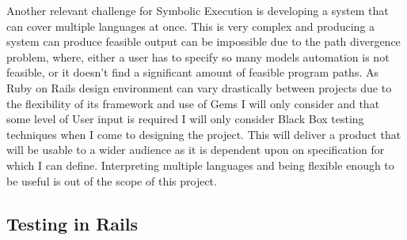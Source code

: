 \documentclass[a4paper,12pt]{article}
\begin{document}
\vspace{3mm}
\par Another relevant challenge for Symbolic Execution is developing a system that can cover multiple languages at once. This is very complex and producing a system can produce feasible output can be impossible due to the path divergence problem, where, either a user has to specify so many models automation is not feasible, or it doesn't find a significant amount of feasible program paths. As Ruby on Rails design environment can vary drastically between projects due to the flexibility of its framework and use of Gems I will only consider and that some level of User input is required I will only consider Black Box testing techniques when I come to designing the project. This will deliver a product that will be usable to a wider audience as it is dependent upon on specification for which I can define. Interpreting multiple languages and being flexible enough to be useful is out of the scope of this project.

\subsection{Testing in Rails}
\end{document}
